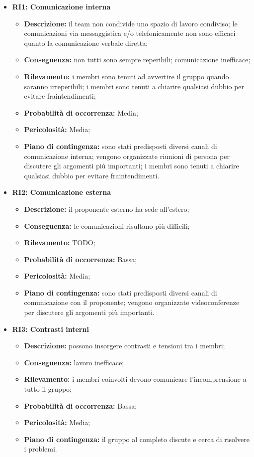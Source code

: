 \begin{itemize}
	\item \textbf{RI1: Comunicazione interna}
	\begin{itemize}
		\item \textbf{Descrizione:} il team non condivide uno spazio di lavoro condiviso; le comunicazioni via messaggistica e/o telefonicamente non sono efficaci quanto la comunicazione verbale diretta;
		\item \textbf{Conseguenza:} non tutti sono sempre reperibili; comunicazione inefficace;
		\item \textbf{Rilevamento:} i membri sono tenuti ad avvertire il gruppo quando saranno irreperibili; i membri sono tenuti a chiarire qualsiasi dubbio per evitare fraintendimenti;
		\item \textbf{Probabilità di occorrenza:} Media;
		\item \textbf{Pericolosità:} Media;
		\item \textbf{Piano di contingenza:} sono stati predisposti diversi canali di comunicazione interna; vengono organizzate riunioni di persona per discutere gli argomenti più importanti; i membri sono tenuti a chiarire qualsiasi dubbio per evitare fraintendimenti.
	\end{itemize}
	
	\item \textbf{RI2: Comunicazione esterna}
	\begin{itemize}
		\item \textbf{Descrizione:} il proponente esterno ha sede all'estero;
		\item \textbf{Conseguenza:} le comunicazioni risultano più difficili;
		\item \textbf{Rilevamento:} TODO;
		\item \textbf{Probabilità di occorrenza:} Bassa;
		\item \textbf{Pericolosità:} Media;
		\item \textbf{Piano di contingenza:} sono stati predisposti diversi canali di comunicazione con il proponente; vengono organizzate videoconferenze per discutere gli argomenti più importanti.
	\end{itemize}
	
	\item \textbf{RI3: Contrasti interni}
	\begin{itemize}
		\item \textbf{Descrizione:} possono insorgere contrasti e tensioni tra i membri;
		\item \textbf{Conseguenza:} lavoro inefficace;
		\item \textbf{Rilevamento:} i membri coinvolti devono comunicare l'incomprensione a tutto il gruppo;
		\item \textbf{Probabilità di occorrenza:} Bassa;
		\item \textbf{Pericolosità:} Media;
		\item \textbf{Piano di contingenza:} il gruppo al completo discute e cerca di risolvere i problemi.
	\end{itemize}
	

\end{itemize}

